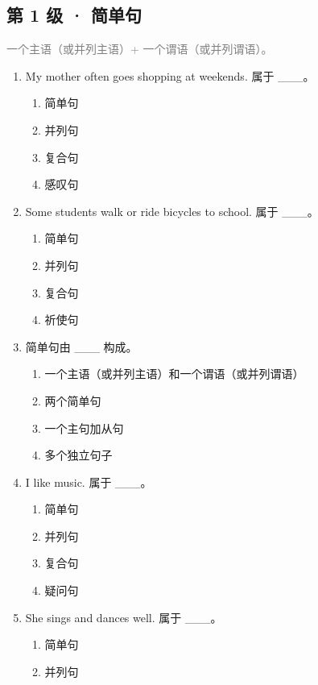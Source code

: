 \documentclass[11pt,a4paper]{ctexart}
\begin{document}
\subsection*{第 1 级 · 简单句}
\noindent\textcolor{gray}{一个主语（或并列主语）+ 一个谓语（或并列谓语）。}\par\smallskip
\begin{enumerate}[leftmargin=*,itemsep=4pt]
\item My mother often goes shopping at weekends. 属于 \_\_\_。
\begin{enumerate}[label=\Alph*.,leftmargin=2em,itemsep=1pt,topsep=2pt]
\item 简单句
\item 并列句
\item 复合句
\item 感叹句
\end{enumerate}
\item Some students walk or ride bicycles to school. 属于 \_\_\_。
\begin{enumerate}[label=\Alph*.,leftmargin=2em,itemsep=1pt,topsep=2pt]
\item 简单句
\item 并列句
\item 复合句
\item 祈使句
\end{enumerate}
\item 简单句由 \_\_\_ 构成。
\begin{enumerate}[label=\Alph*.,leftmargin=2em,itemsep=1pt,topsep=2pt]
\item 一个主语（或并列主语）和一个谓语（或并列谓语）
\item 两个简单句
\item 一个主句加从句
\item 多个独立句子
\end{enumerate}
\item I like music. 属于 \_\_\_。
\begin{enumerate}[label=\Alph*.,leftmargin=2em,itemsep=1pt,topsep=2pt]
\item 简单句
\item 并列句
\item 复合句
\item 疑问句
\end{enumerate}
\item She sings and dances well. 属于 \_\_\_。
\begin{enumerate}[label=\Alph*.,leftmargin=2em,itemsep=1pt,topsep=2pt]
\item 简单句
\item 并列句

\end{enumerate}
\end{enumerate}
\end{document}
